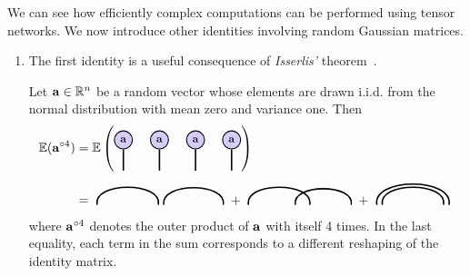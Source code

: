 We can see how efficiently complex computations can be performed using tensor networks. We now introduce other identities involving random Gaussian matrices.
\begin{enumerate}
\item  The first identity is a useful consequence of \emph{Isserlis'} theorem~\citep{isserlis1918formula}.
\begin{theorem}\label{thm:isserlis}
Let $\mathbf{a}\in\mathbb{R}^{n}$ be a random vector whose elements are drawn i.i.d. from the normal distribution with mean zero and variance one. Then
\begin{align*}
\EE(\ab^{\outprod 4}) 
&= 
\EE\left(\begin{tikzpicture}[baseline=\baseline]
   \tikzset{tensor/.style = {minimum size = 0.5cm,shape = circle,thick,draw=black,inner sep = 0pt}, edge/.style = {thick,line width=.4mm},every loop/.style={}}
    \def\y{0.25}
    \def\x{0}
    \node[tensor,fill=red!20!blue!20!white] (a1) at (\x,\y){\scalebox{0.85}{$\ab$}}; 
    \node[tensor,fill=red!20!blue!20!white] (a2) at (\x+1,\y){\scalebox{0.85}{$\ab$}}; 
    \node[tensor,fill=red!20!blue!20!white] (a3) at (\x+2,\y){\scalebox{0.85}{$\ab$}}; 
    \node[tensor,fill=red!20!blue!20!white] (a4) at (\x+3,\y){\scalebox{0.85}{$\ab$}}; 
    \draw[edge](a1) -- (\x,\y-0.85);
    \draw[edge](a2) -- (\x+1,\y-0.85);
    \draw[edge](a3) -- (\x+2,\y-0.85);
    \draw[edge](a4) -- (\x+3,\y-0.85);
\end{tikzpicture}
\right)\\
&=
\begin{tikzpicture}[baseline=\baseline]
    \tikzset{tensor/.style = {minimum size = 0.5cm,shape = circle,thick,draw=black,inner sep = 0pt}, edge/.style = {thick,line width=.4mm},every loop/.style={}}
    \def\y{0}
    \def\x{0}
    \draw[edge] (\x+0.15,\y-0.1) to [out=100,in=80] (\x+1.85,\y-0.1);
    \draw[edge] (\x+2,\y-0.1) to [out=100,in=80] (\x+3.65,\y-0.1);
\end{tikzpicture}
+
\begin{tikzpicture}[baseline=\baseline]
    \tikzset{tensor/.style = {minimum size = 0.5cm,shape = circle,thick,draw=black,inner sep = 0pt}, edge/.style = {thick,line width=.4mm},every loop/.style={}}
    \def\y{0}
    \def\x{0}
    \draw[edge] (\x+0.15,\y-0.1) to [out=100,in=80] (\x+1.85,\y-0.1);
    \draw[edge] (\x+1.45,\y-0.1) to [out=100,in=80] (\x+3,\y-0.1);
\end{tikzpicture}
+
    \begin{tikzpicture}[baseline=\baseline]
    \tikzset{tensor/.style = {minimum size = 0.5cm,shape = circle,thick,draw=black,inner sep = 0pt}, edge/.style = {thick,line width=.4mm},every loop/.style={}}
    \def\y{0}
    \def\x{0}
    \draw[edge] (\x,\y-0.1) to [out=100,in=80] (\x+2,\y-0.1);
    \draw[edge] (\x+0.15,\y-0.1) to [out=100,in=80] (\x+1.85,\y-0.1);
\end{tikzpicture}
\end{align*}
where $\mathbf{a}^{\circ 4}$ denotes the outer product of $\mathbf{a}$ with itself 4 times. In the last equality, each term in the sum corresponds to a different reshaping of the identity matrix.


\end{theorem}
\end{enumerate}
